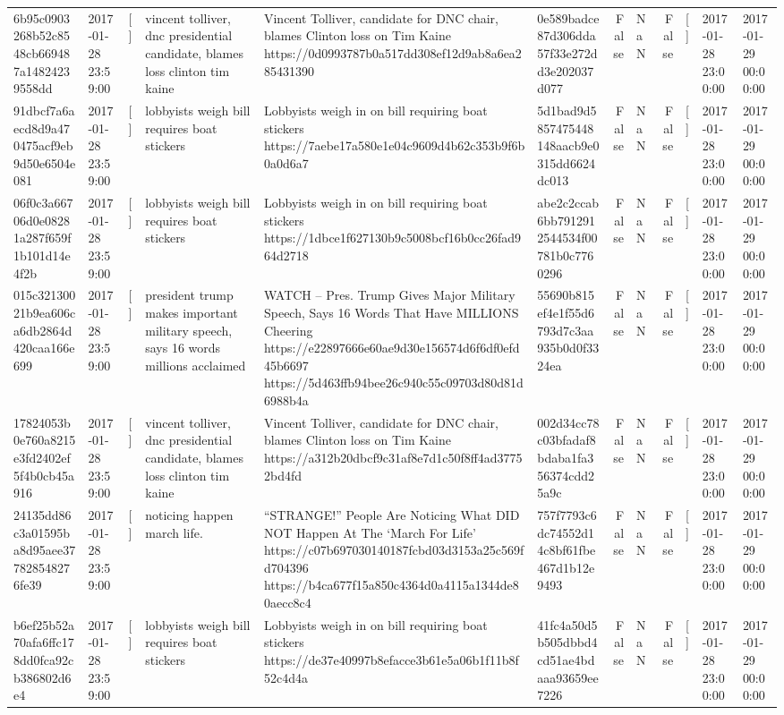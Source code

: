 \begin{tabular}{llllllrlrlll}
6b95c0903268b52c8548cb669487a14824239558dd & 2017-01-28 23:59:00 & [] & vincent tolliver, dnc presidential candidate, blames loss clinton tim kaine & Vincent Tolliver, candidate for DNC chair, blames Clinton loss on Tim Kaine https://0d0993787b0a517dd308ef12d9ab8a6ea285431390 & 0e589badce87d306dda57f33e272dd3e202037d077 & False & NaN & False & [] & 2017-01-28 23:00:00 & 2017-01-29 00:00:00 \\
91dbcf7a6aecd8d9a470475acf9eb9d50e6504e081 & 2017-01-28 23:59:00 & [] & lobbyists weigh bill requires boat stickers & Lobbyists weigh in on bill requiring boat stickers https://7aebe17a580e1e04c9609d4b62c353b9f6b0a0d6a7 & 5d1bad9d5857475448148aacb9e0315dd6624dc013 & False & NaN & False & [] & 2017-01-28 23:00:00 & 2017-01-29 00:00:00 \\
06f0c3a66706d0e08281a287f659f1b101d14e4f2b & 2017-01-28 23:59:00 & [] & lobbyists weigh bill requires boat stickers & Lobbyists weigh in on bill requiring boat stickers https://1dbce1f627130b9c5008bcf16b0cc26fad964d2718 & abe2c2ccab6bb7912912544534f00781b0c7760296 & False & NaN & False & [] & 2017-01-28 23:00:00 & 2017-01-29 00:00:00 \\
015c32130021b9ea606ca6db2864d420caa166e699 & 2017-01-28 23:59:00 & [] & president trump makes important military speech, says 16 words millions acclaimed & WATCH – Pres. Trump Gives Major Military Speech, Says 16 Words That Have MILLIONS Cheering https://e22897666e60ae9d30e156574d6f6df0efd45b6697 https://5d463ffb94bee26c940c55c09703d80d81d6988b4a & 55690b815ef4e1f55d6793d7c3aa935b0d0f3324ea & False & NaN & False & [] & 2017-01-28 23:00:00 & 2017-01-29 00:00:00 \\
17824053b0e760a8215e3fd2402ef5f4b0cb45a916 & 2017-01-28 23:59:00 & [] & vincent tolliver, dnc presidential candidate, blames loss clinton tim kaine & Vincent Tolliver, candidate for DNC chair, blames Clinton loss on Tim Kaine https://a312b20dbcf9c31af8e7d1c50f8ff4ad37752bd4fd & 002d34cc78c03bfadaf8bdaba1fa356374cdd25a9c & False & NaN & False & [] & 2017-01-28 23:00:00 & 2017-01-29 00:00:00 \\
24135dd86c3a01595ba8d95aee377828548276fe39 & 2017-01-28 23:59:00 & [] & noticing happen march life. & “STRANGE!” People Are Noticing What DID NOT Happen At The ‘March For Life’ https://c07b697030140187fcbd03d3153a25c569fd704396 https://b4ca677f15a850c4364d0a4115a1344de80aecc8c4 & 757f7793c6dc74552d14c8bf61fbe467d1b12e9493 & False & NaN & False & [] & 2017-01-28 23:00:00 & 2017-01-29 00:00:00 \\
b6ef25b52a70afa6ffc178dd0fca92cb386802d6e4 & 2017-01-28 23:59:00 & [] & lobbyists weigh bill requires boat stickers & Lobbyists weigh in on bill requiring boat stickers https://de37e40997b8efacce3b61e5a06b1f11b8f52c4d4a & 41fc4a50d5b505dbbd4cd51ae4bdaaa93659ee7226 & False & NaN & False & [] & 2017-01-28 23:00:00 & 2017-01-29 00:00:00 \\

\end{tabular}
